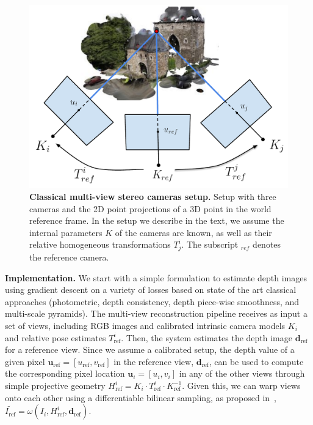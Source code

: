 \begin{figure}[H]
    \begin{center}
        \includegraphics[width=0.56\linewidth]{main/chapter03/data/depth/multiview_setup.pdf} 
    \end{center}
    \caption[Classical multi-view stereo cameras setup]{\textbf{Classical multi-view stereo cameras setup.} Setup with three cameras and the 2D point projections of a  3D point in the world reference frame. In the setup we describe in the text, we assume the internal parameters $K$ of the cameras are known, as well as their relative homogeneous transformations $T^{i}_{j}$. The subscript $_{ref}$ denotes the reference camera. } 
    \label{fig:depth:mvs-scheme}
\end{figure}


\textbf{Implementation.} We start with a simple formulation to estimate depth images using gradient descent on a variety of losses based on state of the art classical approaches (photometric, depth consistency, depth piece-wise smoothness, and multi-scale pyramids). The multi-view reconstruction pipeline receives as input a set of views, including RGB images and calibrated intrinsic camera models $K_{i}$ and relative pose estimates $T_{\text{ref}}^{i}$.  Then, the system   estimates the depth image $\boldsymbol{d}_{\text{ref}}$ for a reference view. Since we assume a calibrated setup, the depth value of a given pixel $\boldsymbol{u}_{\text{ref}} = [u_{\text{ref}},v_{\text{ref}}]$ in the reference view, $\boldsymbol{d}_{\text{ref}}$, can be used to compute the corresponding pixel location $\boldsymbol{u}_i = [u_{i},v_{i}]$ in any of the other views through simple projective geometry $H_{\text{ref}}^{i} = K_i \cdot T_{\text{ref}}^{i} \cdot K_{\text{ref}}^{-1}$. Given this, we can warp views onto each other %
using a differentiable bilinear sampling, as proposed in~\citep{stn_NIPS2015}, $\tilde{I_{\text{ref}}} = \omega(I_i, H_{\text{ref}}^{i}, \boldsymbol{d}_{\text{ref}})$.

